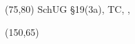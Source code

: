 \documentclass [8pt]{article}
\begin{document}
\pagestyle{empty}

{
\begin{textblock}{60}(75,80)
SchUG §19(3a), TC, \Klasse, \Schuler
\end{textblock}

\begin{textblock}{45}(150,65)
\AddrA\\
\AddrB\\
\AddrC\\
\AddrD
\end{textblock}
\newpage
}
\end{document}
